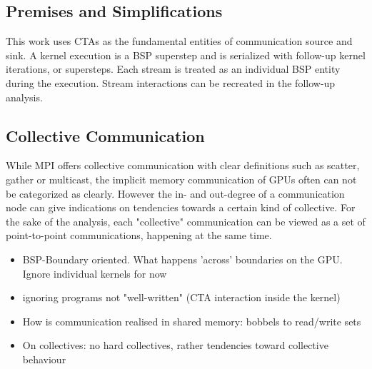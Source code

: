 \subsection{Premises and Simplifications}

This work uses CTAs as the fundamental entities of communication source and sink. A kernel execution is a BSP superstep and is serialized with follow-up kernel iterations, or supersteps. Each stream is treated as
an individual BSP entity during the execution. Stream interactions can be recreated in the follow-up analysis.
\subsection{Collective Communication}
While MPI offers collective communication with clear definitions such as scatter, gather or multicast, the implicit memory communication of GPUs often can not be categorized as clearly. However the in- and out-degree of a communication node can give indications on tendencies towards a certain kind of collective.
For the sake of the analysis, each "collective" communication can be viewed as a set of point-to-point
communications, happening at the same time.  


\begin{itemize}
	\item BSP-Boundary oriented. What happens 'across' boundaries on the GPU. Ignore individual kernels for now
	\item ignoring programs not "well-written" (CTA interaction inside the kernel)
	\item How is communication realised in shared memory: bobbels to read/write sets
	\item On collectives: no hard collectives, rather tendencies toward collective behaviour
\end{itemize}
